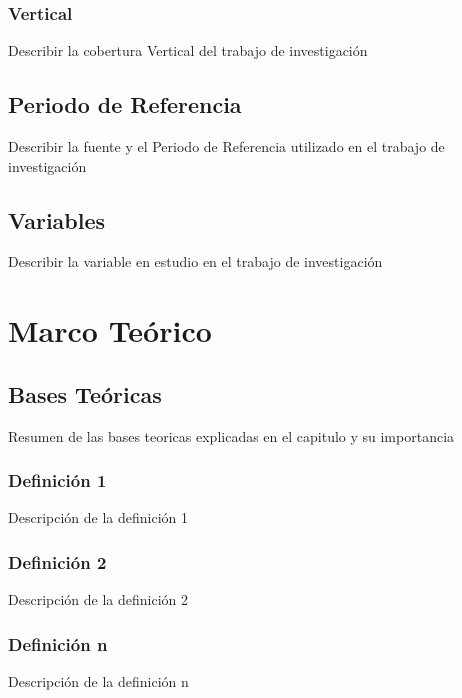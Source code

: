 \documentclass[oneside,11pt]{Latex/Classes/PhDthesisPSnPDF}
\begin{document}
\subsection{Vertical}

Describir la cobertura Vertical del trabajo de investigación

\section{Periodo de Referencia}

Describir la fuente y el Periodo de Referencia utilizado en el trabajo
de investigación

\section{Variables}

Describir la variable en estudio en el trabajo de investigación

\chapter{Marco Teórico}

\section{Bases Teóricas}

Resumen de las bases teoricas explicadas en el capitulo y su
importancia\\

\subsection{Definición 1}

Descripción de la definición 1\\

\subsection{Definición 2}

Descripción de la definición 2\\

\subsection{Definición n}

Descripción de la definición n\\
\end{document}
